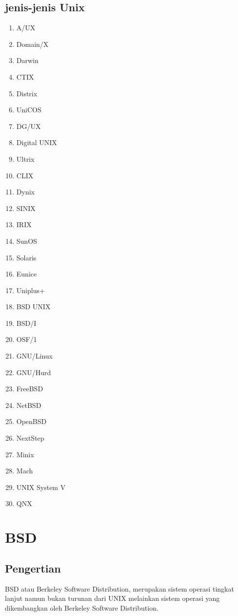 \subsection{jenis-jenis Unix}

\begin{enumerate}
\item A/UX
\item Domain/X
\item Darwin
\item CTIX
\item Distrix
\item UniCOS
\item DG/UX
\item Digital UNIX
\item Ultrix
\item CLIX
\item Dynix
\item SINIX
\item IRIX
\item SunOS
\item Solaris
\item Eunice
\item Uniplus+
\item BSD UNIX
\item BSD/I
\item OSF/1
\item GNU/Linux
\item GNU/Hurd
\item FreeBSD
\item NetBSD
\item OpenBSD
\item NextStep
\item Minix
\item Mach
\item UNIX System V
\item QNX
\end{enumerate} 

\section{BSD}
\subsection{Pengertian}
	BSD atau Berkeley Software Distribution, merupakan sistem operasi tingkat lanjut namun bukan turunan dari UNIX melainkan sistem operasi yang dikembangkan oleh Berkeley Software Distribution.
